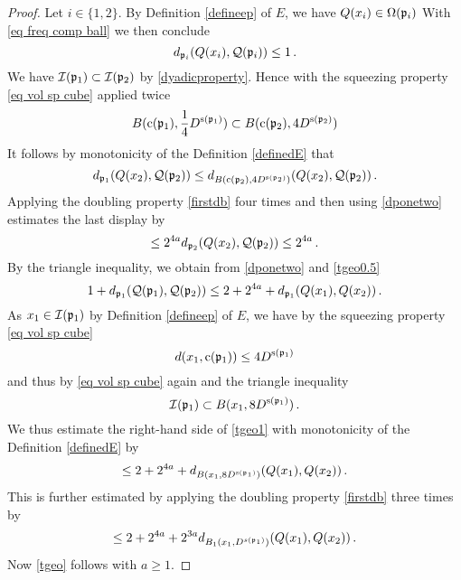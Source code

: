 \begin{proof}
Let $i\in \{1,2\}$.
By Definition \eqref{defineep} of $E$,
we have ${Q}(x_i)\in \Omega(\mathfrak p_i)$
With \eqref{eq freq comp ball} we then conclude
\begin{equation}\label{dponetwo}
    d_{\mathfrak p_i}({Q}(x_i),\mathcal{Q}(\mathfrak p_i))\le 1\, .
\end{equation}
We have $\mathcal{I}(\mathfrak p_1)\subset \mathcal{I}(\mathfrak p_2)$ by \eqref{dyadicproperty}.
Hence with the squeezing property \eqref{eq vol sp cube} applied twice
\begin{equation}
B(\mathrm{c}(\mathfrak p_1),\frac 14 D^{\mathrm{s}(\mathfrak p_1)})
\subset B(\mathrm{c}(\mathfrak p_2), 4 D^{\mathrm{s}(\mathfrak p_2)})
\end{equation}
It follows
by monotonicity of the Definition \eqref{definedE} that
\begin{equation}
    d_{\mathfrak p_1}({Q}(x_2),\mathcal{Q}(\mathfrak p_2))\le
    d_{ B(\mathrm{c}(\mathfrak p_2), 4 D^{\mathrm{s}(\mathfrak p_2)})}({Q}(x_2),\mathcal{Q}(\mathfrak p_2))
    \, .
\end{equation}
Applying the doubling property \eqref{firstdb} four times and then using \eqref{dponetwo} estimates the last display by
\begin{equation}\label{tgeo0.5}
    \le 2^{4a} d_{\mathfrak p_2}({Q}(x_2),\mathcal{Q}(\mathfrak p_2))\le 2^{4a}
    \, .
\end{equation}
By the triangle inequality, we obtain from \eqref{dponetwo} and
\eqref{tgeo0.5}
\begin{equation}\label{tgeo1}
     1+d_{\mathfrak p_1}(\mathcal{Q}(\mathfrak p_1), \mathcal{Q}(\mathfrak p_2))\le  2+2^{4a} +d_{\mathfrak p_1}({Q}(x_1), {Q}(x_2))\, .
\end{equation}
As $x_1\in \mathcal{I}(\mathfrak p_1)$ by Definition \eqref{defineep} of $E$, we have by the squeezing property  \eqref{eq vol sp cube}
\begin{equation}
    d(x_1,\mathrm{c}(\mathfrak p_1))\le 4D^{\mathrm{s}(\mathfrak p_1)}
\end{equation}
and thus by \eqref{eq vol sp cube} again and the triangle inequality
\begin{equation}
    \mathcal{I}(\mathfrak p_1)\subset B(x_1,8D^{\mathrm{s}(\mathfrak p_1)})\, .
\end{equation}
We thus estimate the right-hand side of \eqref{tgeo1} with monotonicity of the  Definition \eqref{definedE} by
\begin{equation}\label{tgeo1.5}
    \le  2+2^{4a}+d_{B(x_1,8D^{\mathrm{s}(\mathfrak p_1)})}({Q}(x_1), {Q}(x_2))\, .
\end{equation}
This is further estimated by applying the doubling property  \eqref{firstdb} three times by
\begin{equation}\label{tgeo2}
    \le  2+2^{4a}+2^{3a}d_{B_1(x_1, D^{s(\mathfrak p_1)})}({Q}(x_1), {Q}(x_2))\, .
\end{equation}
Now \eqref{tgeo} follows with $a\ge 1$.
\end{proof}




